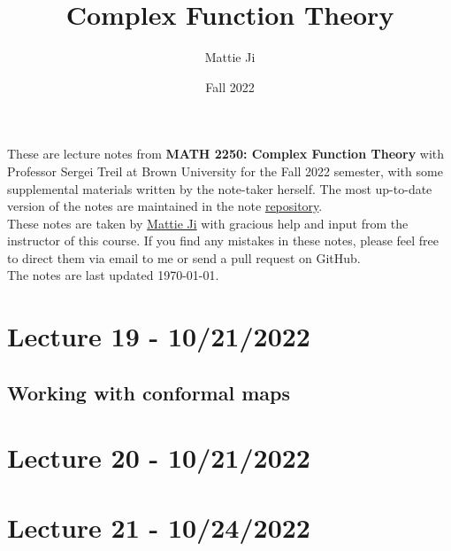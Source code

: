 \documentclass{article}
\title{Complex Function Theory}
\author{Mattie Ji}
\date{Fall 2022}
\begin{document}
\maketitle
These are lecture notes from \textbf{MATH 2250: Complex Function Theory} with Professor Sergei Treil at Brown University for the Fall 2022 semester, with some supplemental materials written by the note-taker herself. The most up-to-date version of the notes are maintained in the note \href{https://github.com/maroon-scorch/MATH2550-notes}{repository}.\\

These notes are taken by \href{https://github.com/maroon-scorch}{Mattie Ji} with gracious help and input from the instructor of this course. If you find any mistakes in these notes, please feel free to direct them via email to me or send a pull request on GitHub.\\

The notes are last updated \today.
\tableofcontents
\newpage




















\section{Lecture 19 - 10/21/2022}

\subsection{Working with conformal maps}



\section{Lecture 20 - 10/21/2022}

\section{Lecture 21 - 10/24/2022}
\end{document}
